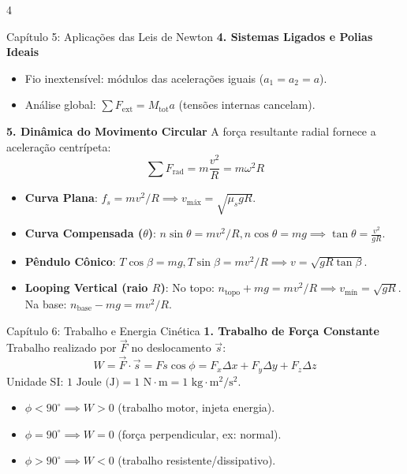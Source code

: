 \documentclass[9pt,a4paper,landscape]{extarticle}
\begin{document}
\begin{multicols*}{4}
\begin{topicbox}{Capítulo 5: Aplicações das Leis de Newton}
\textbf{4. Sistemas Ligados e Polias Ideais}
\begin{itemize}
    \item Fio inextensível: módulos das acelerações iguais ($a_1 = a_2 = a$).
    \item Análise global: $\sum F_{\text{ext}} = M_{\text{tot}} a$ (tensões internas cancelam).
\end{itemize}

\textbf{5. Dinâmica do Movimento Circular}
A força resultante radial fornece a aceleração centrípeta:
\begin{equation*}
    \sum F_{\text{rad}} = m \frac{v^2}{R} = m \omega^2 R
\end{equation*}
\begin{itemize}
    \item \textbf{Curva Plana}: $f_s = m v^2/R \implies v_{\text{máx}} = \sqrt{\mu_s g R}$.
    \item \textbf{Curva Compensada ($\theta$)}: $n\sin\theta = mv^2/R, n\cos\theta = mg \implies \tan\theta = \frac{v^2}{gR}$.
    \item \textbf{Pêndulo Cônico}: $T\cos\beta = mg, T\sin\beta = m v^2/R \implies v = \sqrt{g R \tan\beta}$.
    \item \textbf{Looping Vertical (raio $R$)}:
    No topo: $n_{\text{topo}} + mg = mv^2/R \implies v_{\text{mín}} = \sqrt{gR}$.
    Na base: $n_{\text{base}} - mg = mv^2/R$.
\end{itemize}
\end{topicbox}

\begin{greenbox}{Capítulo 6: Trabalho e Energia Cinética}
\textbf{1. Trabalho de Força Constante}
Trabalho realizado por $\vec{F}$ no deslocamento $\vec{s}$:
\begin{equation*}
    W = \vec{F} \cdot \vec{s} = F s \cos\phi = F_x \Delta x + F_y \Delta y + F_z \Delta z
\end{equation*}
Unidade SI: $1\text{ Joule (J)} = 1\text{ N}\cdot\text{m} = 1\text{ kg}\cdot\text{m}^2/\text{s}^2$.
\begin{itemize}
    \item $\phi < 90^\circ \implies W > 0$ (trabalho motor, injeta energia).
    \item $\phi = 90^\circ \implies W = 0$ (força perpendicular, ex: normal).
    \item $\phi > 90^\circ \implies W < 0$ (trabalho resistente/dissipativo).
\end{itemize}


\end{greenbox}
\end{multicols*}
\end{document}
